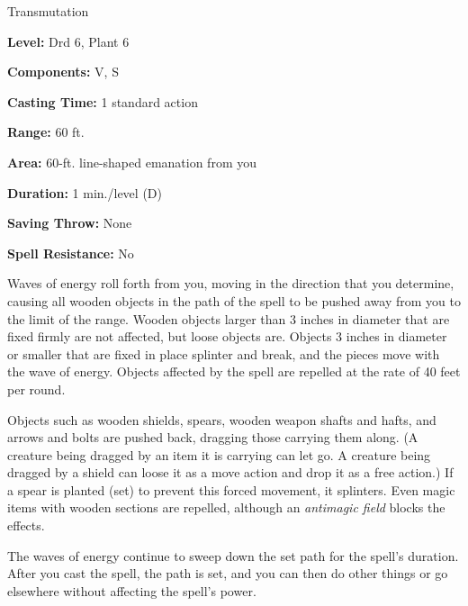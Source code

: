 
Transmutation

\textbf{Level:} Drd 6, Plant 6

\textbf{Components:} V, S

\textbf{Casting Time:} 1 standard action

\textbf{Range:} 60 ft.

\textbf{Area:} 60-ft. line-shaped emanation from you

\textbf{Duration:} 1 min./level (D)

\textbf{Saving Throw:} None

\textbf{Spell Resistance:} No

Waves of energy roll forth from you, moving in the direction that you determine, 
causing all wooden objects in the path of the spell to be pushed away from you 
to the limit of the range. Wooden objects larger than 3 inches in diameter that 
are fixed firmly are not affected, but loose objects are. Objects 3 inches in diameter 
or smaller that are fixed in place splinter and break, and the pieces move with 
the wave of energy. Objects affected by the spell are repelled at the rate of 40 
feet per round.

Objects such as wooden shields, spears, wooden weapon shafts and hafts, and arrows 
and bolts are pushed back, dragging those carrying them along. (A creature being 
dragged by an item it is carrying can let go. A creature being dragged by a shield 
can loose it as a move action and drop it as a free action.) If a spear is planted 
(set) to prevent this forced movement, it splinters. Even magic items with wooden 
sections are repelled, although an \textit{antimagic field} blocks the effects.

The waves of energy continue to sweep down the set path for the spell's duration. 
After you cast the spell, the path is set, and you can then do other things or 
go elsewhere without affecting the spell's power.

